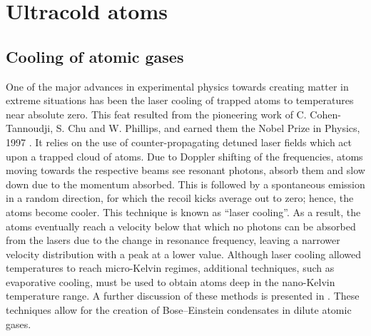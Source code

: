 \section{Ultracold atoms}\label{sec:coldatoms}
\subsection{Cooling of atomic gases}\label{sub:cooling}
One of the major advances in experimental physics towards creating matter in extreme situations has been the laser cooling of trapped atoms to temperatures near absolute zero. This feat resulted from the pioneering work of C. Cohen-Tannoudji, S. Chu and W.
Phillips, and earned them the Nobel Prize in Physics, 1997 \cite{AO:Chu_revmod_1998,AO:Cohen_revmod_1998,AO:Phillips_revmod_1998}.
It relies on the use of counter-propagating detuned laser fields which act upon a trapped cloud of atoms. Due to Doppler shifting of the frequencies, atoms moving towards the respective beams see resonant photons, absorb them and slow down due to the momentum absorbed. This is followed by a spontaneous emission in a random direction, for which the recoil kicks average out to zero; hence, the atoms become cooler. This technique is known as ``laser cooling''. As a result, the atoms eventually reach a velocity below that which no photons can be absorbed from the lasers due to the change in resonance frequency, leaving a narrower velocity distribution with a peak at a lower value. Although laser cooling allowed temperatures to reach micro-Kelvin regimes, additional techniques, such as evaporative cooling, must be used to obtain atoms deep in the nano-Kelvin temperature range. A further discussion of these methods is presented in \cite{BK:Foot_2005,BK:Metcalf_1999}. These techniques allow for the creation of Bose--Einstein condensates in dilute atomic gases.

